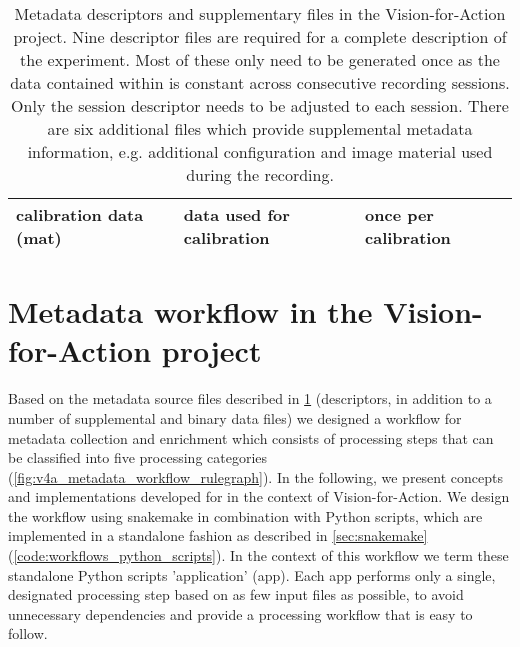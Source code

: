 \begin{table}[]
\begin{tabular}{lll}
\multicolumn{1}{|l|}{calibration data (mat)}       & \multicolumn{1}{l|}{data used for calibration}                                                                         & \multicolumn{1}{l|}{once per calibration}                                            \\ \hline
\end{tabular}
\caption[Metadata files in the Vision-for-Action project]{Metadata descriptors and supplementary files in the Vision-for-Action project. Nine  descriptor files are required for a complete description of the experiment. Most of these only need to be generated once as the data contained within is constant across consecutive recording sessions. Only the session descriptor needs to be adjusted to each session. There are six additional files which provide supplemental metadata information, e.g. additional configuration and image material used during the recording.}
\label{tab:v4a_metadata_files}
\end{table}

\section{Metadata workflow in the Vision-for-Action project}

Based on the metadata source files described in \cref{tab:v4a_metadata_files} (descriptors, in addition to a number of supplemental and binary data files) we designed a workflow for metadata collection and enrichment which consists of processing steps that can be classified into five processing categories (\cref{fig:v4a_metadata_workflow_rulegraph}). In the following, we present concepts and implementations developed for in the context of Vision-for-Action. We design the workflow using snakemake in combination with Python scripts, which are implemented in a standalone fashion as described in \cref{sec:snakemake} (\cref{code:workflows_python_scripts}). In the context of this workflow we term these standalone Python scripts 'application' (app). Each app performs only a single, designated processing step based on as few input files as possible, to avoid unnecessary dependencies and provide a processing workflow that is easy to follow.


